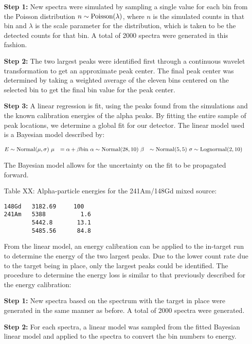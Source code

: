 \textbf{Step 1:}
  New spectra were simulated by sampling a single value for each bin
  from the Poisson distribution $n \sim \rm{Poisson}(\lambda)$,
  where $n$ is the simulated counts in that bin and $\lambda$ is the scale
  parameter for the distribution, which is taken to be the detected
  counts for that bin. A total of 2000 spectra were generated in this
  fashion.

\textbf{Step 2:}
  The two largest peaks were identified first through a continuous
  wavelet transformation to get an approximate peak center. The final
  peak center was determined by taking a weighted average of the eleven
  bins centered on the selected bin to get the final bin value for the
  peak center.

\textbf{Step 3:}
  A linear regression is fit, using the peaks found from the simulations
  and the known calibration energies of the alpha peaks. By fitting the
  entire sample of peak locations, we determine a global fit for our
  detector. The linear model used is a Bayesian model described by:

\begin{align*}
    E &\sim \rm{Normal}(\mu, \sigma) \
    \mu &= \alpha + \beta \rm{bin} \
    \alpha &\sim \rm{Normal}(28, 10) \
    \beta &\sim \rm{Normal}(5, 5) \
    \sigma &\sim \rm{Lognormal}(2, 10)
\end{align*}

  The Bayesian model allows for the uncertainty on the fit to be
  propagated forward.

Table XX: Alpha-particle energies for the 241Am/148Gd mixed source:

\begin{verbatim}
148Gd   3182.69     100
241Am   5388          1.6
        5442.8       13.1
        5485.56      84.8
\end{verbatim}

From the linear model, an energy calibration can be applied to the
in-target run to determine the energy of the two largest peaks. Due to
the lower count rate due to the target being in place, only the largest
peaks could be identified. The procedure to determine the energy loss is
similar to that previously described for the energy calibration:

\textbf{Step 1:}
  New spectra based on the spectrum with the target in place were
  generated in the same manner as before. A total of 2000 spectra were
  generated.

\textbf{Step 2:}
  For each spectra, a linear model was sampled from the fitted Bayesian
  linear model and applied to the spectra to convert the bin numbers to
  energy.

